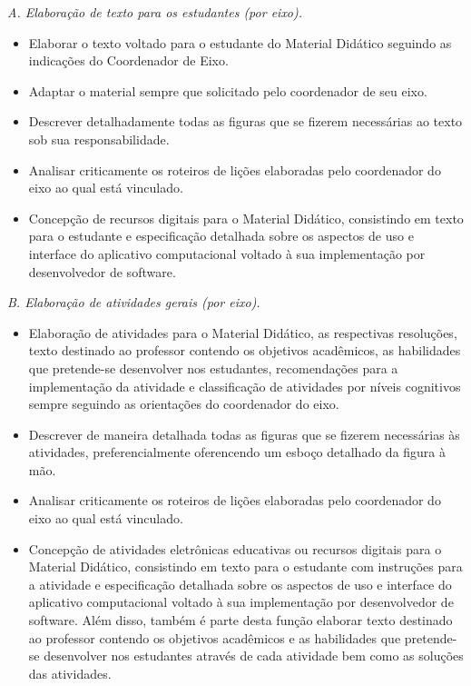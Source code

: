 \documentclass[10 pt]{article}
\begin{document}
{\it A. Elaboração de texto para os estudantes (por eixo).}
\begin{itemize} %
  \item     Elaborar o texto voltado para o estudante do Material Didático seguindo as indicações do Coordenador de Eixo.
  \item     Adaptar o material sempre que solicitado pelo coordenador de seu eixo.
  \item     Descrever detalhadamente todas as figuras que se fizerem necessárias ao texto sob sua responsabilidade.
  \item     Analisar criticamente os roteiros de lições elaboradas pelo coordenador do eixo ao qual está vinculado.
  \item     Concepção de recursos digitais para o Material Didático, consistindo em texto para o estudante e especificação detalhada sobre os aspectos de uso e interface do aplicativo computacional voltado à sua implementação por desenvolvedor de software.
\end{itemize} %
\vspace{0.2cm}

{\it B. Elaboração de atividades gerais (por eixo).}
\begin{itemize} %
  \item   Elaboração de atividades para o Material Didático, as respectivas resoluções, texto destinado ao professor contendo os objetivos acadêmicos, as habilidades que pretende-se desenvolver nos estudantes, recomendações para a implementação da atividade e classificação de atividades por níveis cognitivos sempre seguindo as orientações do coordenador do eixo.
  \item   Descrever de maneira detalhada todas as figuras que se fizerem necessárias às atividades, preferencialmente oferencendo um esboço detalhado da figura à mão.
  \item   Analisar criticamente os roteiros de lições elaboradas pelo coordenador do eixo ao qual está vinculado.
  \item   Concepção de atividades eletrônicas educativas ou recursos digitais para o Material Didático, consistindo em texto para o estudante com instruções para a atividade e especificação detalhada sobre os aspectos de uso e interface do aplicativo computacional voltado à sua implementação por desenvolvedor de software. Além disso, também é parte desta função elaborar texto destinado ao professor contendo os objetivos acadêmicos e as habilidades que pretende-se desenvolver nos estudantes através de cada atividade bem como as soluções das atividades.
\end{itemize} %
\vspace{0.2cm}
\end{document}
